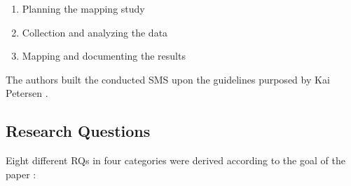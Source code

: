 \begin{enumerate}
    \item Planning the mapping study
    \item Collection and analyzing the data
    \item Mapping and documenting the results
\end{enumerate}

The authors built the conducted SMS upon the guidelines purposed by Kai Petersen \cite{petersen:SMS}.

\subsection{Research Questions}

Eight different RQs in four categories were derived 
according to the goal of the paper \cite{waseem:SMSMSADevOps}:

